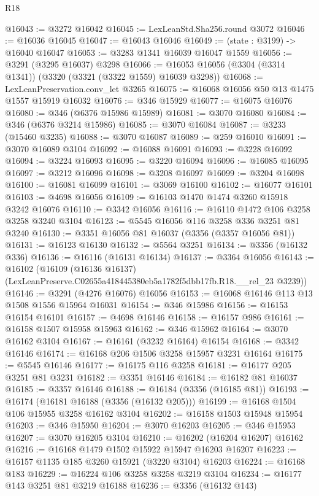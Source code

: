 \begin{lexlean}{R18}
\begin{coremodule}
@16043 := @3272 @16042
@16045 := LexLeanStd.Sha256.round @3072
@16046 := @16036 @16045
@16047 := @16043 @16046
@16049 := (state : @3199) -> @16040 @16047
@16053 := @3283 @1341 @16039 @16047 @1559
@16056 := @3291 (@3295 @16037) @3298
@16066 := @16053 @16056 (@3304 (@3314 @1341)) (@3320 (@3321 (@3322 @1559) @16039 @3298))
@16068 := LexLeanPreservation.conv_let @3265
@16075 := @16068 @16056 @50 @13 @1475 @1557 @15919 @16032
@16076 := @346 @15929
@16077 := @16075 @16076
@16080 := @346 (@6376 @15986 @15989)
@16081 := @3070 @16080
@16084 := @346 (@6376 @3214 @15986)
@16085 := @3070 @16084
@16087 := @3233 (@15460 @3235)
@16088 := @3070 @16087
@16089 := @259 @16010
@16091 := @3070 @16089 @3104
@16092 := @16088 @16091
@16093 := @3228 @16092
@16094 := @3224 @16093
@16095 := @3220 @16094
@16096 := @16085 @16095
@16097 := @3212 @16096
@16098 := @3208 @16097
@16099 := @3204 @16098
@16100 := @16081 @16099
@16101 := @3069 @16100
@16102 := @16077 @16101
@16103 := @4698 @16056
@16109 := @16103 @1470 @1474 @3260 @15918 @3242 @16076
@16110 := @3342 @16056
@16116 := @16110 @1472 @106 @3258 @3258 @3240 @3104
@16123 := @5545 @16056 @116 @3258 @336 @3251 @81 @3240
@16130 := @3351 @16056 @81 @16037 (@3356 (@3357 @16056 @81))
@16131 := @16123 @16130
@16132 := @5564 @3251
@16134 := @3356 (@16132 @336)
@16136 := @16116 (@16131 @16134)
@16137 := @3364 @16056
@16143 := @16102
    (@16109 (@16136 @16137) (LexLeanPreserve.C02655a418445380eb5a1782f5dbb17fb.R18.__rel_23 @3239))
@16146 := @3291 (@4276 @16076) @16056
@16153 := @16068 @16146 @113 @13 @1508 @1556 @15964 @16031
@16154 := @346 @15986
@16156 := @16153 @16154 @16101
@16157 := @4698 @16146
@16158 := @16157 @986
@16161 := @16158 @1507 @15958 @15963
@16162 := @346 @15962
@16164 := @3070 @16162 @3104
@16167 := @16161 (@3232 @16164) @16154
@16168 := @3342 @16146
@16174 := @16168 @206 @1506 @3258 @15957 @3231 @16164
@16175 := @5545 @16146
@16177 := @16175 @116 @3258
@16181 := @16177 @205 @3251 @81 @3231
@16182 := @3351 @16146
@16184 := @16182 @81 @16037
@16185 := @3357 @16146
@16188 := @16184 (@3356 (@16185 @81))
@16193 := @16174 (@16181 @16188 (@3356 (@16132 @205)))
@16199 := @16168 @1504 @106 @15955 @3258 @16162 @3104
@16202 := @16158 @1503 @15948 @15954
@16203 := @346 @15950
@16204 := @3070 @16203
@16205 := @346 @15953
@16207 := @3070 @16205 @3104
@16210 := @16202 (@16204 @16207) @16162
@16216 := @16168 @1479 @1502 @15922 @15947 @16203 @16207
@16223 := @16157 @1135 @185 @3260 @15921 (@3220 @3104) @16203
@16224 := @16168 @183
@16229 := @16224 @106 @3258 @3258 @3219 @3104
@16234 := @16177 @143 @3251 @81 @3219 @16188
@16236 := @3356 (@16132 @143)

\end{coremodule}
\end{lexlean}
